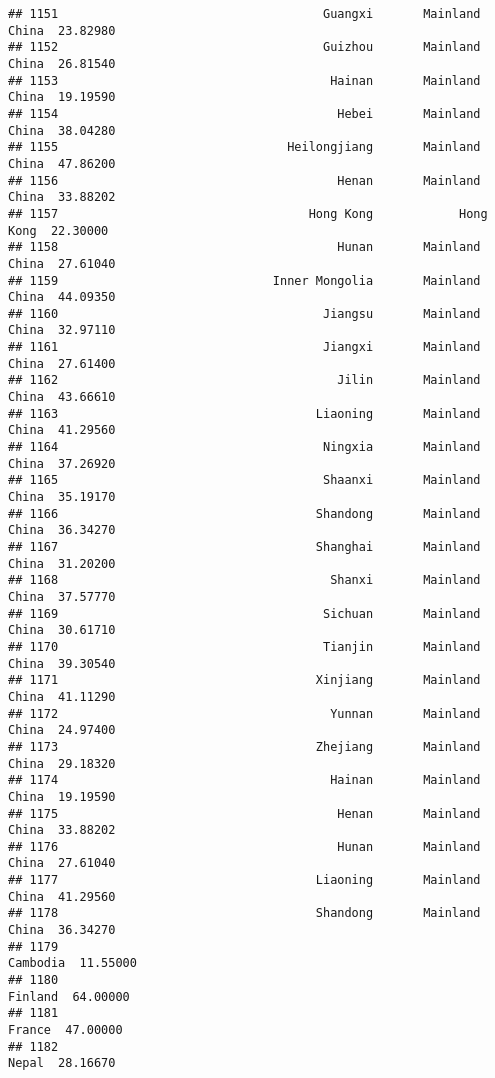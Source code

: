 \documentclass[
]{article}
\begin{document}
\begin{verbatim}
## 1151                                     Guangxi       Mainland China  23.82980
## 1152                                     Guizhou       Mainland China  26.81540
## 1153                                      Hainan       Mainland China  19.19590
## 1154                                       Hebei       Mainland China  38.04280
## 1155                                Heilongjiang       Mainland China  47.86200
## 1156                                       Henan       Mainland China  33.88202
## 1157                                   Hong Kong            Hong Kong  22.30000
## 1158                                       Hunan       Mainland China  27.61040
## 1159                              Inner Mongolia       Mainland China  44.09350
## 1160                                     Jiangsu       Mainland China  32.97110
## 1161                                     Jiangxi       Mainland China  27.61400
## 1162                                       Jilin       Mainland China  43.66610
## 1163                                    Liaoning       Mainland China  41.29560
## 1164                                     Ningxia       Mainland China  37.26920
## 1165                                     Shaanxi       Mainland China  35.19170
## 1166                                    Shandong       Mainland China  36.34270
## 1167                                    Shanghai       Mainland China  31.20200
## 1168                                      Shanxi       Mainland China  37.57770
## 1169                                     Sichuan       Mainland China  30.61710
## 1170                                     Tianjin       Mainland China  39.30540
## 1171                                    Xinjiang       Mainland China  41.11290
## 1172                                      Yunnan       Mainland China  24.97400
## 1173                                    Zhejiang       Mainland China  29.18320
## 1174                                      Hainan       Mainland China  19.19590
## 1175                                       Henan       Mainland China  33.88202
## 1176                                       Hunan       Mainland China  27.61040
## 1177                                    Liaoning       Mainland China  41.29560
## 1178                                    Shandong       Mainland China  36.34270
## 1179                                                         Cambodia  11.55000
## 1180                                                          Finland  64.00000
## 1181                                                           France  47.00000
## 1182                                                            Nepal  28.16670

\end{verbatim}
\end{document}
